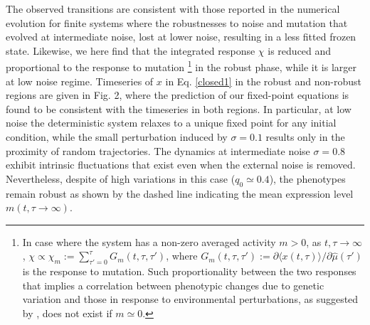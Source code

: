 \documentclass[%
 reprint,
superscriptaddress,
 amsmath,amssymb,
 prl,
]{revtex4-2}
\begin{document}
    The observed transitions are consistent with those  reported in the numerical evolution for finite systems \cite{KanekoPloSOne2007} where the robustnesses to noise and mutation that evolved at intermediate noise,  lost at lower noise, resulting in a less fitted frozen state. Likewise, we here find that the integrated response $\chi$ is reduced and  proportional to the response to mutation  \footnote{%
 In  case where the system has a non-zero  averaged activity $m >0$, as $t, \tau \rightarrow \infty$,
   $\chi \propto \chi_m := \sum_{\tau' = 0}^\tau G_m(t,\tau,\tau')$, where  $G_{m}(t, \tau, \tau') :=    \partial \langle x(t, \tau) \rangle\big/\partial \hat{\mu}(\tau')  $ is the response to mutation. Such proportionality between the two responses that implies a correlation between phenotypic changes due to genetic variation  and those in response to environmental perturbations, as suggested by \cite{KanekoPloSOne2007,Sato2003,Kaneko2006,Ciliberti, Sakata2020, Pham2022, Tang2021, Landry, Silva-Rocha, Uchida},  does not exist if  $m\simeq 0$.} in the robust phase, while it is larger at low noise regime.  Timeseries of $x$ in Eq. \eqref{closed1} in the robust and non-robust regions are given in Fig. 2, where the prediction of our fixed-point equations is found to be consistent with the timeseries  in  both regions. In particular, at low noise the deterministic system relaxes to a unique fixed point for any initial condition, while the small perturbation induced by $\sigma = 0.1$ results only in the proximity of random trajectories. The dynamics at intermediate noise $\sigma = 0.8$ exhibit intrinsic fluctuations that exist even when the external noise is removed. Nevertheless, despite of high variations in this case ($q_0\simeq 0.4$), the phenotypes  remain robust as shown by the dashed line indicating the mean expression level $m(t, \tau \rightarrow \infty)$.
\end{document}
